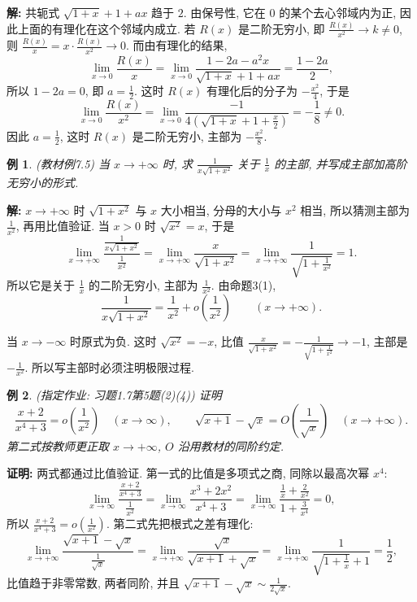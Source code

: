 \documentclass[UTF8,openany]{ctexbook}
\theoremstyle{chinesetextbook}
\newtheorem{example}{例}[section]
\newenvironment{cnproof}{\par\indent\textbf{证明:} \ignorespaces}{\par}
\newenvironment{cnsolution}{\par\indent\textbf{解:} \ignorespaces}{\par}
\begin{document}
\begin{cnsolution}
共轭式 $\sqrt{1+x}+1+ax$ 趋于 $2$. 由保号性, 它在 $0$ 的某个去心邻域内为正, 因此上面的有理化在这个邻域内成立. 若 $R(x)$ 是二阶无穷小, 即 $\displaystyle\frac{R(x)}{x^2}\to k\ne0$, 则 $\displaystyle\frac{R(x)}x=x\cdot\frac{R(x)}{x^2}\to0$. 而由有理化的结果,
\[
\lim_{x\to0}\frac{R(x)}x=\lim_{x\to0}\frac{1-2a-a^2x}{\sqrt{1+x}+1+ax}=\frac{1-2a}2,
\]
所以 $1-2a=0$, 即 $\displaystyle a=\frac12$. 这时 $R(x)$ 有理化后的分子为 $\displaystyle-\frac{x^2}4$, 于是
\[
\lim_{x\to0}\frac{R(x)}{x^2}=\lim_{x\to0}\frac{-1}{4\left(\sqrt{1+x}+1+\frac x2\right)}=-\frac18\ne0.
\]
因此 $\displaystyle a=\frac12$, 这时 $R(x)$ 是二阶无穷小, 主部为 $\displaystyle-\frac{x^2}8$.
\end{cnsolution}
\begin{example}
\textnormal{(教材例7.5)} 当 $x\to+\infty$ 时, 求 $\displaystyle\frac1{x\sqrt{1+x^2}}$ 关于 $\displaystyle\frac1x$ 的主部, 并写成主部加高阶无穷小的形式.
\end{example}
\begin{cnsolution}
$x\to+\infty$ 时 $\sqrt{1+x^2}$ 与 $x$ 大小相当, 分母的大小与 $x^2$ 相当, 所以猜测主部为 $\displaystyle\frac1{x^2}$, 再用比值验证. 当 $x>0$ 时 $\sqrt{x^2}=x$, 于是
\[
\lim_{x\to+\infty}\frac{\frac1{x\sqrt{1+x^2}}}{\frac1{x^2}}=\lim_{x\to+\infty}\frac x{\sqrt{1+x^2}}=\lim_{x\to+\infty}\frac1{\sqrt{1+\frac1{x^2}}}=1.
\]
所以它是关于 $\displaystyle\frac1x$ 的二阶无穷小, 主部为 $\displaystyle\frac1{x^2}$. 由命题3(1),
\[
\frac1{x\sqrt{1+x^2}}=\frac1{x^2}+o\!\left(\frac1{x^2}\right)\qquad(x\to+\infty).
\]
\end{cnsolution}
当 $x\to-\infty$ 时原式为负. 这时 $\sqrt{x^2}=-x$, 比值 $\displaystyle\frac x{\sqrt{1+x^2}}=-\frac1{\sqrt{1+\frac1{x^2}}}\to-1$, 主部是 $\displaystyle-\frac1{x^2}$. 所以写主部时必须注明极限过程.
\begin{example}
\textnormal{(指定作业: 习题1.7第5题(2)(4))} 证明
\[
\frac{x+2}{x^4+3}=o\!\left(\frac1{x^2}\right)\quad(x\to\infty),\qquad\sqrt{x+1}-\sqrt x=O\!\left(\frac1{\sqrt x}\right)\quad(x\to+\infty).
\]
第二式按教师更正取 $x\to+\infty$, $O$ 沿用教材的同阶约定.
\end{example}
\begin{cnproof}
两式都通过比值验证. 第一式的比值是多项式之商, 同除以最高次幂 $x^4$:
\[
\lim_{x\to\infty}\frac{\frac{x+2}{x^4+3}}{\frac1{x^2}}=\lim_{x\to\infty}\frac{x^3+2x^2}{x^4+3}=\lim_{x\to\infty}\frac{\frac1x+\frac2{x^2}}{1+\frac3{x^4}}=0,
\]
所以 $\displaystyle\frac{x+2}{x^4+3}=o\!\left(\frac1{x^2}\right)$. 第二式先把根式之差有理化:
\[
\lim_{x\to+\infty}\frac{\sqrt{x+1}-\sqrt x}{\frac1{\sqrt x}}=\lim_{x\to+\infty}\frac{\sqrt x}{\sqrt{x+1}+\sqrt x}=\lim_{x\to+\infty}\frac1{\sqrt{1+\frac1x}+1}=\frac12,
\]
比值趋于非零常数, 两者同阶, 并且 $\displaystyle\sqrt{x+1}-\sqrt x\sim\frac1{2\sqrt x}$.
\end{cnproof}
\end{document}
